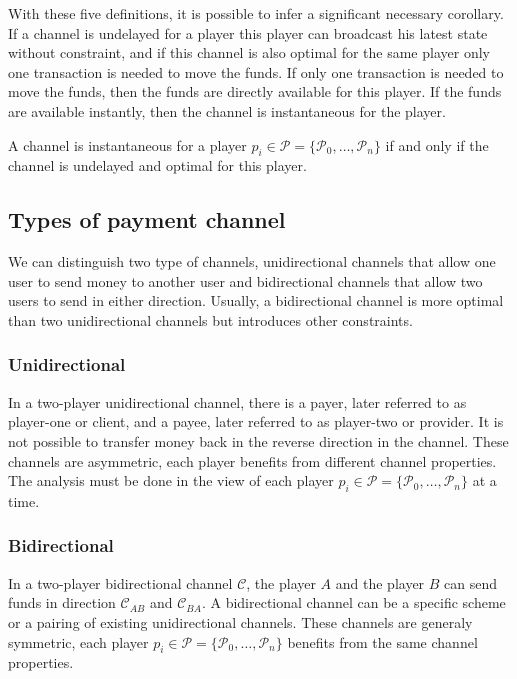 With these five definitions, it is possible to infer a significant necessary
corollary. If a channel is undelayed for a player this player can broadcast his
latest state without constraint, and if this channel is also optimal for the
same player only one transaction is needed to move the funds. If only one
transaction is needed to move the funds, then the funds are directly available
for this player. If the funds are available instantly, then the channel is
instantaneous for the player.

\begin{corollary}[Instantaneous]
  A channel is instantaneous for a player $p_i \in \mathcal{P} = \{\mathcal{P}_0, \dots,
  \mathcal{P}_n\}$ if and only if the channel is undelayed and optimal for this
  player.
\end{corollary}

\subsection{Types of payment channel}

We can distinguish two type of channels, unidirectional channels that allow
one user to send money to another user and bidirectional
channels that allow two users to send in either direction. Usually, a
bidirectional channel is more optimal than two unidirectional channels but
introduces other constraints.

\subsubsection{Unidirectional}

In a two-player unidirectional channel, there is a payer, later referred to as
player-one or client, and a payee, later referred to as player-two or provider.
It is not possible to transfer money back in the reverse direction in the
channel. These channels are asymmetric, each player benefits from different channel
properties. The analysis must be done in the view of each player $p_i \in
\mathcal{P} = \{\mathcal{P}_0, \dots, \mathcal{P}_n\}$ at a time.

\subsubsection{Bidirectional}

In a two-player bidirectional channel $\mathcal{C}$, the player $A$ and the
player $B$ can send funds in direction $\mathcal{C}_{AB}$ and
$\mathcal{C}_{BA}$. A bidirectional channel can be a specific scheme or a
pairing of existing unidirectional channels. These channels are generaly
symmetric, each player $p_i \in \mathcal{P} = \{\mathcal{P}_0, \dots,
\mathcal{P}_n\}$ benefits from the same channel properties.

